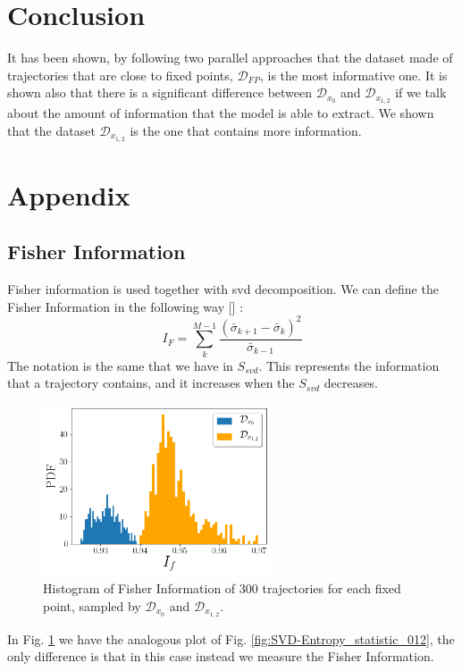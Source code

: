 \documentclass{article}
\begin{document}
\section{Conclusion}

It has been shown, by following two parallel approaches that the dataset made of trajectories that are close to fixed points, $\mathcal{D}_{FP}$, is the most informative one. It is shown also that there is a significant difference between $\mathcal{D}_{x_0}$ and $\mathcal{D}_{x_{1,2}}$ if we talk about the amount of information that the model is able to extract. We shown that the dataset $\mathcal{D}_{x_{1,2}}$ is the one that contains more information.




\newpage
\section{Appendix}
\subsection{Fisher Information}
Fisher information is used together with svd decomposition.
We can define the Fisher Information in the following way [\cite{TamingChaos}] :
\begin{equation}
    I_{F}=\sum^{M-1}_{k}\frac{(\bar{\sigma}_{k+1}-\bar{\sigma}_{k})^2}{\bar{\sigma}_{k-1}}
\end{equation}
The notation is the same that we have in $S_{svd}$. This represents the information that a trajectory contains, and it increases when the $S_{svd}$ decreases.
\begin{figure}
    \centering
    \includegraphics[width=0.6\textwidth]{images/fisher_info_ZeroVSother.png}
    \caption{Histogram of Fisher Information of 300 trajectories for each fixed point, sampled by $\mathcal{D}_{x_0}$ and $\mathcal{D}_{x_{1,2}}$. }
    \label{fig:fisher_histogram_0vs12}
\end{figure}
In Fig. \ref{fig:fisher_histogram_0vs12} we have the analogous plot of Fig. \ref{fig:SVD-Entropy_statistic_012}, the only difference is that in this case instead we measure the Fisher Information.

\nocite{*}


\end{document}
